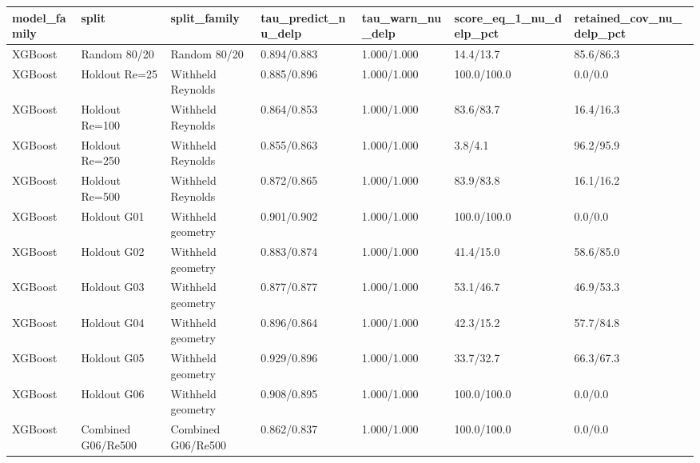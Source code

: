 \begin{tabular}{lllllll}
\hline
model_family & split & split_family & tau_predict_nu_delp & tau_warn_nu_delp & score_eq_1_nu_delp_pct & retained_cov_nu_delp_pct \\
\hline
XGBoost & Random 80/20 & Random 80/20 & 0.894/0.883 & 1.000/1.000 & 14.4/13.7 & 85.6/86.3 \\
XGBoost & Holdout Re=25 & Withheld Reynolds & 0.885/0.896 & 1.000/1.000 & 100.0/100.0 & 0.0/0.0 \\
XGBoost & Holdout Re=100 & Withheld Reynolds & 0.864/0.853 & 1.000/1.000 & 83.6/83.7 & 16.4/16.3 \\
XGBoost & Holdout Re=250 & Withheld Reynolds & 0.855/0.863 & 1.000/1.000 & 3.8/4.1 & 96.2/95.9 \\
XGBoost & Holdout Re=500 & Withheld Reynolds & 0.872/0.865 & 1.000/1.000 & 83.9/83.8 & 16.1/16.2 \\
XGBoost & Holdout G01 & Withheld geometry & 0.901/0.902 & 1.000/1.000 & 100.0/100.0 & 0.0/0.0 \\
XGBoost & Holdout G02 & Withheld geometry & 0.883/0.874 & 1.000/1.000 & 41.4/15.0 & 58.6/85.0 \\
XGBoost & Holdout G03 & Withheld geometry & 0.877/0.877 & 1.000/1.000 & 53.1/46.7 & 46.9/53.3 \\
XGBoost & Holdout G04 & Withheld geometry & 0.896/0.864 & 1.000/1.000 & 42.3/15.2 & 57.7/84.8 \\
XGBoost & Holdout G05 & Withheld geometry & 0.929/0.896 & 1.000/1.000 & 33.7/32.7 & 66.3/67.3 \\
XGBoost & Holdout G06 & Withheld geometry & 0.908/0.895 & 1.000/1.000 & 100.0/100.0 & 0.0/0.0 \\
XGBoost & Combined G06/Re500 & Combined G06/Re500 & 0.862/0.837 & 1.000/1.000 & 100.0/100.0 & 0.0/0.0 \\
\hline
\end{tabular}
